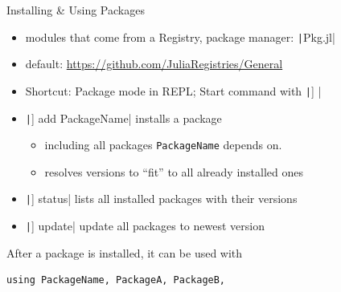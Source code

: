 \documentclass[aspectratio=169, 11pt, handout]{beamer}
\begin{document}
    \begin{frame}[fragile]{Installing \& Using Packages}
        \begin{itemize}[<+->]
            \item modules that come from a \alert{Registry}, package manager: \texttt|Pkg.jl|
            \item default: \url{https://github.com/JuliaRegistries/General}
            \item Shortcut: \alert{Package mode} in REPL; Start command with \texttt|] |
            \item \texttt|] add PackageName| installs a package
            \begin{itemize}
                \item including all packages \texttt{PackageName} \alert{depends} on.
                \item resolves versions to “fit” to all already installed ones
            \end{itemize}
            \item \texttt|] status| lists all installed packages with their versions
            \item \texttt|] update| update all packages to newest version
        \end{itemize}
        \pause
        After a package is installed, it can be used with
        \begin{verbatim}
using PackageName, PackageA, PackageB,
        \end{verbatim}
    \end{frame}
\end{document}
